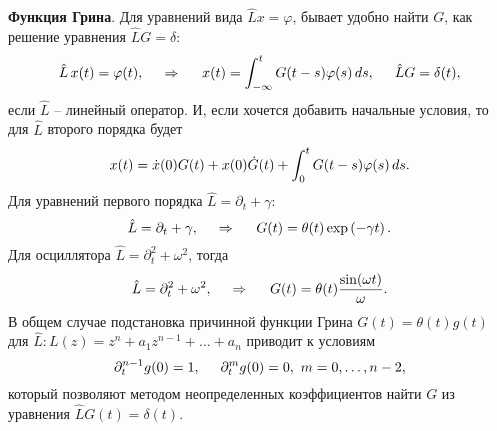 




\textbf{Функция Грина}. Для уравнений вида $\hat{L} x = \varphi$, бывает удобно найти $G$, как решение уравнения $\hat{L} G = \delta$:
\begin{equation}
    \hat{L}\, x(t) = \varphi(t), 
    \hspace{0.5cm} \Rightarrow \hspace{0.5cm}
    x(t) = \int_{-\infty}^{t} G(t-s) \varphi(s) \, d s,
    \hspace{5 mm} 
    \hat{L} G = \delta(t),
\end{equation}
если $\hat{L}$ -- линейный оператор. 
И, если хочется добавить начальные условия, то для $\hat{L}$ второго порядка будет
\begin{equation*}
    x(t) = \dot{x}(0) G(t) + x(0) \dot{G}(t) + \int_{0}^{t} G(t-s) \varphi(s) \, d s.
\end{equation*}
Для уравнений первого порядка $\hat{L} = \partial_t + \gamma$:
\begin{equation}
    \hat{L} = \partial_t + \gamma,
    \hspace{0.5cm} \Rightarrow \hspace{0.5cm}
    G(t) = \theta(t) \exp\left(- \gamma t\right).
\end{equation}
Для осциллятора $\hat{L} = \partial_t^2 + \omega^2$, тогда
\begin{equation}
    \hat{L} = \partial_t^2 + \omega^2,
    \hspace{0.5cm} \Rightarrow \hspace{0.5cm}
    G(t) = \theta(t) \frac{\sin(\omega t)}{\omega}.
\end{equation}
В общем случае подстановка причинной функции Грина $G(t) = \theta(t) g(t)$ для $\hat{L} \colon  L(z) = z^n + a_1 z^{n-1} + \ldots + a_n$ приводит к условиям 
\begin{equation*}
    \partial_t^{n-1} g(0) = 1,
    \hspace{5 mm} 
    \partial_t^m g(0) = 0, \  m = 0,\ldots,n-2,
\end{equation*}
который позволяют методом неопределенных коэффициентов найти $G$ из уравнения $\hat{L} G(t) = \delta(t)$. 



